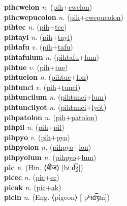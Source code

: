 \textbf{pihcwelon} \textit{n.} (\hyperref[pih]{pih}+\hyperref[cwelon]{cwelon})
 \label{pihcwelon} \\
\textbf{pihcwepucolon} \textit{n.} (\hyperref[pih]{pih}+\hyperref[cwepucolon]{cwepucolon})
 \label{pihcwepucolon} \\
\textbf{pihtec} \textit{n.} (\hyperref[pih]{pih}+\hyperref[tec]{tec})
 \label{pihtec} \\
\textbf{pihtayl} \textit{n.} (\hyperref[pih]{pih}+\hyperref[tayl]{tayl})
 \label{pihtayl} \\
\textbf{pihtafu} \textit{v.} (\hyperref[pih]{pih}+\hyperref[tafu]{tafu})
 \label{pihtafu} \\
\textbf{pihtafulum} \textit{n.} (\hyperref[pihtafu]{pihtafu}+\hyperref[lum]{lum})
 \label{pihtafulum} \\
\textbf{pihtue} \textit{v.} (\hyperref[pih]{pih}+\hyperref[tue]{tue})
 \label{pihtue} \\
\textbf{pihtuelon} \textit{n.} (\hyperref[pihtue]{pihtue}+\hyperref[lon]{lon})
 \label{pihtuelon} \\
\textbf{pihtunci} \textit{v.} (\hyperref[pih]{pih}+\hyperref[tunci]{tunci})
 \label{pihtunci} \\
\textbf{pihtuncilum} \textit{n.} (\hyperref[pihtunci]{pihtunci}+\hyperref[lum]{lum})
 \label{pihtuncilum} \\
\textbf{pihtuncilyot} \textit{n.} (\hyperref[pihtunci]{pihtunci}+\hyperref[lyot]{lyot})
 \label{pihtuncilyot} \\
\textbf{pihpatolon} \textit{n.} (\hyperref[pih]{pih}+\hyperref[patolon]{patolon})
 \label{pihpatolon} \\
\textbf{pihpil} \textit{n.} (\hyperref[pih]{pih}+\hyperref[pil]{pil})
 \label{pihpil} \\
\textbf{pihpyo} \textit{v.} (\hyperref[pih]{pih}+\hyperref[pyo]{pyo})
 \label{pihpyo} \\
\textbf{pihpyolon} \textit{n.} (\hyperref[pihpyo]{pihpyo}+\hyperref[lon]{lon})
 \label{pihpyolon} \\
\textbf{pihpyolum} \textit{n.} (\hyperref[pihpyo]{pihpyo}+\hyperref[lum]{lum})
 \label{pihpyolum} \\
\textbf{pic} \textit{n.} (Hin. ⟨बीज⟩ [biːd͡ʒ])
 \label{pic} \\
\textbf{picec} \textit{n.} (\hyperref[pic]{pic}+\hyperref[ec]{ec})
 \label{picec} \\
\textbf{picak} \textit{n.} (\hyperref[pic]{pic}+\hyperref[ak]{ak})
 \label{picak} \\
\textbf{picin} \textit{n.} (Eng. ⟨pigeon⟩ [ˈpʰɪd͡ʒɪn])

